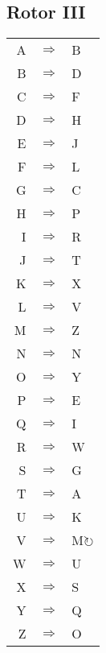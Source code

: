 \begin{multicols}{2}
\subsection{Rotor III}
\begin{supertabular}{rcl}
A & $\Rightarrow$ & B \\
B & $\Rightarrow$ & D \\
C & $\Rightarrow$ & F \\
D & $\Rightarrow$ & H \\
E & $\Rightarrow$ & J \\
F & $\Rightarrow$ & L \\
G & $\Rightarrow$ & C \\
H & $\Rightarrow$ & P \\
I & $\Rightarrow$ & R \\
J & $\Rightarrow$ & T \\
K & $\Rightarrow$ & X \\
L & $\Rightarrow$ & V \\
M & $\Rightarrow$ & Z \\
N & $\Rightarrow$ & N \\
O & $\Rightarrow$ & Y \\
P & $\Rightarrow$ & E \\
Q & $\Rightarrow$ & I \\
R & $\Rightarrow$ & W \\
S & $\Rightarrow$ & G \\
T & $\Rightarrow$ & A \\
U & $\Rightarrow$ & K \\
V & $\Rightarrow$ & M$\circlearrowright$ \\
W & $\Rightarrow$ & U \\
X & $\Rightarrow$ & S \\
Y & $\Rightarrow$ & Q \\
Z & $\Rightarrow$ & O \\
\end{supertabular}


\end{multicols}
